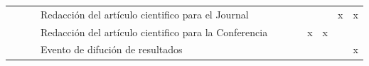 \documentclass[a4paper,11pt]{article}
\begin{document}
\begin{table}[H]
\begin{tabular}{p{0.6cm}p{0.6cm}p{6cm}p{4cm}p{1cm}cccccc}
		&                       &                                                                                                                                                                                                                                                                                            & Redacción del artículo cientifico para el Journal                                                    &                    &                       &                        & \multicolumn{1}{l}{} & \multicolumn{1}{l}{} & \multicolumn{1}{c}{x} & \multicolumn{1}{c}{x}  \\
		&                       &                                                                                                                                                                                                                                                                                            & Redacción del artículo cientifico para la Conferencia                                                &                    &                       &                        & x                    & x                    &                       &                        \\
		&                       &                                                                                                                                                                                                                                                                                            & Evento de difución de resultados                                                                     &                    &                       &                        & \multicolumn{1}{l}{} & \multicolumn{1}{l}{} &                       & \multicolumn{1}{c}{x}  \\  \hline
		
		
	\end{tabular}
\end{table}














%



	
\end{document}
